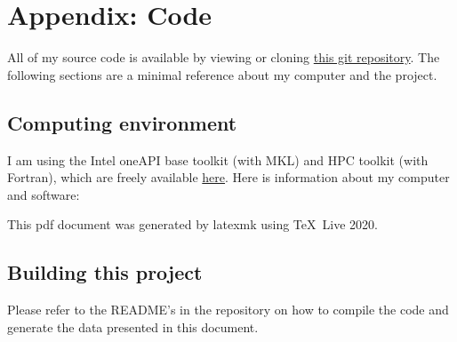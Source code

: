 \documentclass{article}
\begin{document}
\section{
Appendix: Code
}

All of my source code is available by viewing or cloning
\href{https://github.com/lxvm/ph121c.git}{this git repository}.
The following sections are a minimal reference about my computer
and the project.

\subsection{
Computing environment
}

I am using the Intel oneAPI base toolkit (with MKL)
and HPC toolkit (with Fortran), which are freely available
\href{https://software.intel.com/content/www/us/en/develop/
articles/free-intel-software-developer-tools.html}{here}.
Here is information about my computer and software:



This pdf document was generated by latexmk using \TeX\ Live 2020.

\subsection{
Building this project
}

Please refer to the README's in the repository on how to compile the
code and generate the data presented in this document.
\end{document}
